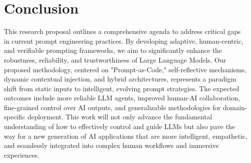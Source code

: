 \documentclass{article}
\begin{document}
\section{Conclusion}

This research proposal outlines a comprehensive agenda to address critical gaps in current prompt engineering practices. By developing adaptive, human-centric, and verifiable prompting frameworks, we aim to significantly enhance the robustness, reliability, and trustworthiness of Large Language Models. Our proposed methodology, centered on "Prompt-as-Code," self-reflective mechanisms, dynamic contextual injection, and hybrid architectures, represents a paradigm shift from static inputs to intelligent, evolving prompt strategies. The expected outcomes include more reliable LLM agents, improved human-AI collaboration, fine-grained control over AI outputs, and generalizable methodologies for domain-specific deployment. This work will not only advance the fundamental understanding of how to effectively control and guide LLMs but also pave the way for a new generation of AI applications that are more intelligent, empathetic, and seamlessly integrated into complex human workflows and immersive experiences.


\end{document}
